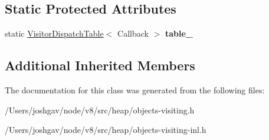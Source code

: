 \subsection*{Static Protected Attributes}
\begin{DoxyCompactItemize}
\item 
static \hyperlink{classv8_1_1internal_1_1_visitor_dispatch_table}{Visitor\+Dispatch\+Table}$<$ Callback $>$ {\bfseries table\+\_\+}\hypertarget{classv8_1_1internal_1_1_static_marking_visitor_a27cfe7719c12c56bfcf61b0610476eb2}{}\label{classv8_1_1internal_1_1_static_marking_visitor_a27cfe7719c12c56bfcf61b0610476eb2}

\end{DoxyCompactItemize}
\subsection*{Additional Inherited Members}


The documentation for this class was generated from the following files\+:\begin{DoxyCompactItemize}
\item 
/\+Users/joshgav/node/v8/src/heap/objects-\/visiting.\+h\item 
/\+Users/joshgav/node/v8/src/heap/objects-\/visiting-\/inl.\+h\end{DoxyCompactItemize}
